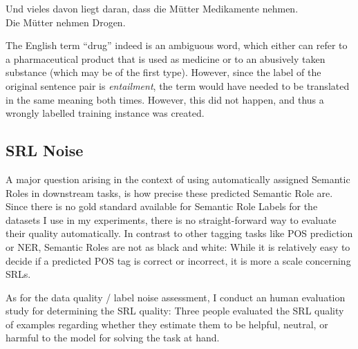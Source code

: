 {\begin{examples}
  \item Und vieles davon liegt daran, dass die Mütter Medikamente nehmen.\\
        Die Mütter nehmen Drogen.
\end{examples}

The English term ``drug'' indeed is an ambiguous word, which either can refer to a pharmaceutical
product that is used as medicine or to an abusively taken substance (which may be of the first
type). However, since
the label of the original sentence pair is \emph{entailment}, the term would have needed
to be translated in the same meaning both times. However, this did not happen, and thus
a wrongly labelled training instance was created.



\subsection{SRL Noise}
\label{sec:srl-noise}

A major question arising in the context of using automatically assigned Semantic Roles in
downstream tasks, is how precise these predicted Semantic Role are. Since there is no gold standard
available for Semantic Role Labels for the datasets I use in my experiments, there is no
straight-forward way to evaluate their quality {\color{red} automatically}. In contrast to
other tagging tasks like POS prediction or NER, Semantic Roles are not as black and white:
While it is relatively easy to decide if a predicted POS tag is correct or incorrect, it
{\color{red} is more a scale} concerning SRLs.

As for the data quality / label noise assessment, I conduct an human evaluation study
for determining the SRL quality: Three people evaluated the SRL quality of examples regarding
whether they estimate them to be helpful, neutral, or harmful to the model for solving
the task at hand.


}
